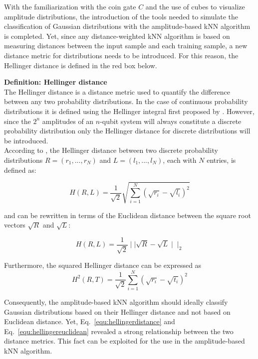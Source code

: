 With the familiarization with the coin gate $C$ and the use of cubes to visualize amplitude distributions, the introduction of the tools needed to simulate the classification of Gaussian distributions with the amplitude-based kNN algorithm is completed. Yet, since any distance-weighted kNN algorithm is based on measuring distances between the input sample and each training sample, a new distance metric for distributions needs to be introduced. For this reason, the Hellinger distance is defined in the red box below.

\begin{redbox}
\textbf{Definition: Hellinger distance}\\
\newline
The Hellinger distance is a distance metric used to quantify the difference between any two probability distributions. In the case of continuous probability distributions it is defined using the Hellinger integral first proposed by . However, since the $2^n$ amplitudes of an $n$-qubit system will always constitute a discrete probability distribution only the Hellinger distance for discrete distributions will be introduced.\\
\newline
According to , the Hellinger distance between two discrete probability distributions $R = (r_1,...,r_N)$ and $L = (l_1,...,l_N)$, each with $N$ entries, is defined as:

\begin{equation}
\label{equ:hellingerdistance}
H(R,L) = \frac{1}{\sqrt{2}}\sqrt{\sum_{i=1}^N (\sqrt{r_i} - \sqrt{l_i})^2}
\end{equation}

and can be rewritten in terms of the Euclidean distance between the square root vectors $\sqrt{R}$ and $\sqrt{L}$:

\begin{equation}
\label{equ:hellingereuclidean}
H(R,L) = \frac{1}{\sqrt{2}} \mid\mid\sqrt{R} - \sqrt{L}\mid\mid_2
\end{equation}

Furthermore, the squared Hellinger distance can be expressed as
\begin{equation}
\label{equ:squaredhellingerdistance}
H^2(R,T) = \frac{1}{\sqrt{2}}\sum_{i=1}^N (\sqrt{r_i} - \sqrt{t_i})^2
\end{equation}
\end{redbox}

Consequently, the amplitude-based kNN algorithm should ideally classify Gaussian distributions based on their Hellinger distance and not based on Euclidean distance. Yet, Eq.~\ref{equ:hellingerdistance} and Eq.~\ref{equ:hellingereuclidean} revealed a strong relationship between the two distance metrics. This fact can be exploited for the use in the amplitude-based kNN algorithm.

